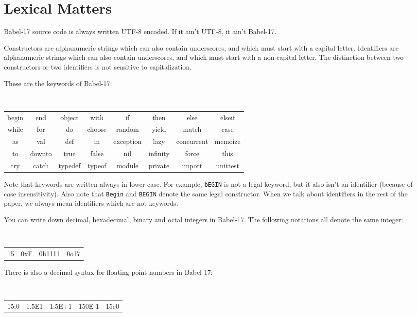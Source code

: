\documentclass[11pt]{amsart}
\begin{document}
\section{Lexical Matters}
Babel-17 source code is always written UTF-8 encoded. If it ain't UTF-8, it ain't Babel-17. 

Constructors are alphanumeric strings which can also contain underscores, and which must start with a capital letter. 
Identifiers are alphanumeric strings which can also contain underscores, and which must start with a non-capital letter.
The distinction between two constructors or two identifiers is not sensitive to capitalization.

These are the keywords of Babel-17:
\begin{center}
\tt
\begin{tabular}{cccccccc}
begin & end & object & with & if & then & else & elseif \\
while &  for & do & choose & random & yield & match & case \\
as & val & def & in & exception & lazy & concurrent & memoize \\
to & downto & true & false & nil & infinity &  force & this \\
try & catch &  typedef &  typeof &  module &  private &  import & unittest  
\end{tabular}
\end{center}
Note that keywords are written always in lower case. For example, {\tt bEGIN} is not a legal keyword, but it also isn't an identifier (because of case insensitivity). Also note that {\tt Begin} and {\tt BEGIN} denote the same legal constructor. When we talk about identifiers in the rest of the paper, we always mean identifiers which are not keywords.

You can write down decimal, hexadecimal, binary and octal integers in Babel-17. The following notations all denote the same integer:
\begin{center}
\tt
\begin{tabular}{cccc}
15 & 0xF & 0b1111 &  0o17
\end{tabular}
\end{center}

There is also a decimal syntax for floating point numbers in Babel-17:
\begin{center}
\tt
\begin{tabular}{ccccc}
15.0 & 1.5E1 & 1.5E+1 &  150E-1 & 15e0
\end{tabular}
\end{center}
\end{document}

